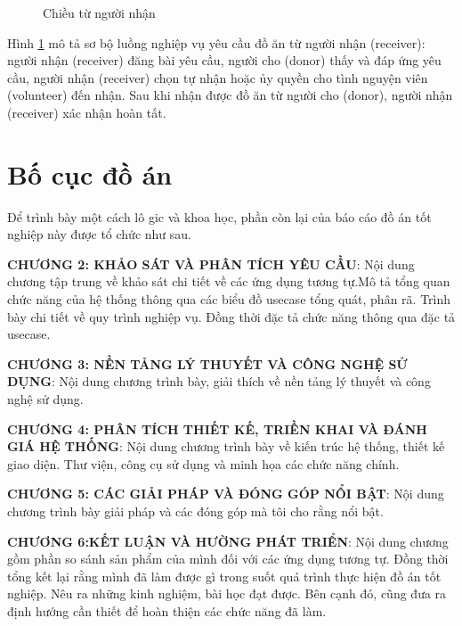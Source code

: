 \documentclass[../main.tex]{subfiles}%
\begin{document}
\begin{figure}[h]
    \centering
    \caption{Chiều từ người nhận}
    \label{fig:luong_tu_nguoi_nhan}
\end{figure}

Hình \ref{fig:luong_tu_nguoi_nhan} mô tả sơ bộ luồng nghiệp vụ yêu cầu đồ ăn từ người nhận (receiver): người nhận (receiver) đăng bài yêu cầu, người cho (donor) thấy và đáp ứng yêu cầu, người nhận (receiver) chọn tự nhận hoặc ủy quyền cho tình nguyện viên (volunteer) đến nhận. Sau khi nhận được đồ ăn từ người cho (donor), người nhận (receiver) xác nhận hoàn tất.


\section{Bố cục đồ án}%
\label{section:1.4}
Để trình bày một cách lô gic và khoa học, phần còn lại của báo cáo đồ án tốt nghiệp này được tổ chức như sau.

\textbf{\MakeUppercase{Chương 2: Khảo sát và phân tích yêu cầu}}: Nội dung chương tập trung về khảo sát chi tiết về các ứng dụng tương tự.Mô tả tổng quan chức năng của hệ thống thông qua các biểu đồ usecase tổng quát, phân rã. Trình bày chi tiết về quy trình nghiệp vụ. Đồng thời đặc tả chức năng thông qua đặc tả usecase.

\textbf{\MakeUppercase{Chương 3: Nền tảng lý thuyết và công nghệ sử dụng}}: Nội dung chương trình bày, giải thích về nền tảng lý thuyết và công nghệ sử dụng.

\textbf{\MakeUppercase{Chương 4: Phân tích thiết kế, triền khai và đánh giá hệ thống}}: Nội dung chương trình bày về kiến trúc hệ thống, thiết kế giao diện. Thư viện, công cụ sử dụng và minh họa các chức năng chính.

\textbf{\MakeUppercase{Chương 5: Các giải pháp và đóng góp nổi bật}}: Nội dung chương trình bày giải pháp và các đóng góp mà tôi cho rằng nổi bật. 

\textbf{\MakeUppercase{Chương 6:Kết luận và hường phát triển}}: Nội dung chương gồm phần so sánh sản phẩm của mình đối với các ứng dụng tương tự. Đồng thời tổng kết lại rằng mình đã làm được gì trong suốt quá trình thực hiện đồ án tốt nghiệp. Nêu ra những kinh nghiệm, bài học đạt được. Bên cạnh đó, cũng đưa ra định hướng cần thiết để hoàn thiện các chức năng đã làm.

\ifSubfilesClassLoaded{\printbibliography{}}{}
\end{document}
